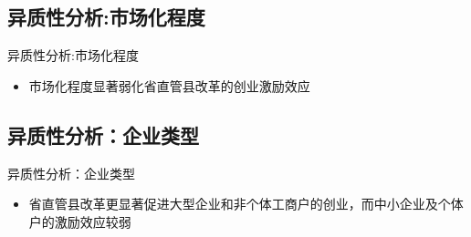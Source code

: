 \documentclass{beamer}
\newcommand{\tightlist}{%
  \setlength{\itemsep}{0pt}\setlength{\parskip}{0pt}}
\begin{document}
\subsection{异质性分析:市场化程度}\label{ux5f02ux8d28ux6027ux5206ux6790ux5e02ux573aux5316ux7a0bux5ea6}

\begin{frame}{异质性分析:市场化程度}
\begin{adjustbox}{max width=0.95\textwidth,center}

\end{adjustbox}

\begin{itemize}
\tightlist
\item
  市场化程度显著弱化省直管县改革的创业激励效应
\end{itemize}
\end{frame}

\subsection{异质性分析：企业类型}\label{ux5f02ux8d28ux6027ux5206ux6790ux4f01ux4e1aux7c7bux578b}

\begin{frame}{异质性分析：企业类型}
\begin{adjustbox}{max width=0.95\textwidth,center}

\end{adjustbox}

\begin{itemize}
\tightlist
\item
  省直管县改革更显著促进大型企业和非个体工商户的创业，而中小企业及个体户的激励效应较弱
\end{itemize}
\end{frame}
\end{document}
